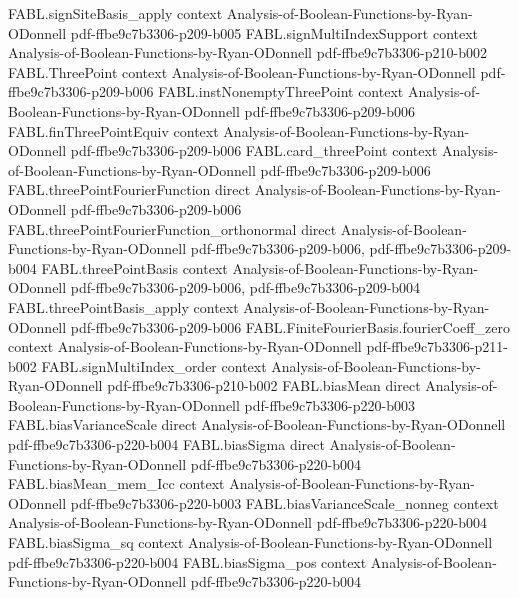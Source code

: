 \begin{theorem}
\proofstep
  {FABL.signSiteBasis_apply}
  {context}
  {Analysis-of-Boolean-Functions-by-Ryan-ODonnell}
  {pdf-ffbe9c7b3306-p209-b005}
\proofstep
  {FABL.signMultiIndexSupport}
  {context}
  {Analysis-of-Boolean-Functions-by-Ryan-ODonnell}
  {pdf-ffbe9c7b3306-p210-b002}
\proofstep
  {FABL.ThreePoint}
  {context}
  {Analysis-of-Boolean-Functions-by-Ryan-ODonnell}
  {pdf-ffbe9c7b3306-p209-b006}
\proofstep
  {FABL.instNonemptyThreePoint}
  {context}
  {Analysis-of-Boolean-Functions-by-Ryan-ODonnell}
  {pdf-ffbe9c7b3306-p209-b006}
\proofstep
  {FABL.finThreePointEquiv}
  {context}
  {Analysis-of-Boolean-Functions-by-Ryan-ODonnell}
  {pdf-ffbe9c7b3306-p209-b006}
\proofstep
  {FABL.card_threePoint}
  {context}
  {Analysis-of-Boolean-Functions-by-Ryan-ODonnell}
  {pdf-ffbe9c7b3306-p209-b006}
\proofstep
  {FABL.threePointFourierFunction}
  {direct}
  {Analysis-of-Boolean-Functions-by-Ryan-ODonnell}
  {pdf-ffbe9c7b3306-p209-b006}
\proofstep
  {FABL.threePointFourierFunction_orthonormal}
  {direct}
  {Analysis-of-Boolean-Functions-by-Ryan-ODonnell}
  {pdf-ffbe9c7b3306-p209-b006,
    pdf-ffbe9c7b3306-p209-b004}
\proofstep
  {FABL.threePointBasis}
  {context}
  {Analysis-of-Boolean-Functions-by-Ryan-ODonnell}
  {pdf-ffbe9c7b3306-p209-b006,
    pdf-ffbe9c7b3306-p209-b004}
\proofstep
  {FABL.threePointBasis_apply}
  {context}
  {Analysis-of-Boolean-Functions-by-Ryan-ODonnell}
  {pdf-ffbe9c7b3306-p209-b006}
\proofstep
  {FABL.FiniteFourierBasis.fourierCoeff_zero}
  {context}
  {Analysis-of-Boolean-Functions-by-Ryan-ODonnell}
  {pdf-ffbe9c7b3306-p211-b002}
\proofstep
  {FABL.signMultiIndex_order}
  {context}
  {Analysis-of-Boolean-Functions-by-Ryan-ODonnell}
  {pdf-ffbe9c7b3306-p210-b002}
\proofstep
  {FABL.biasMean}
  {direct}
  {Analysis-of-Boolean-Functions-by-Ryan-ODonnell}
  {pdf-ffbe9c7b3306-p220-b003}
\proofstep
  {FABL.biasVarianceScale}
  {direct}
  {Analysis-of-Boolean-Functions-by-Ryan-ODonnell}
  {pdf-ffbe9c7b3306-p220-b004}
\proofstep
  {FABL.biasSigma}
  {direct}
  {Analysis-of-Boolean-Functions-by-Ryan-ODonnell}
  {pdf-ffbe9c7b3306-p220-b004}
\proofstep
  {FABL.biasMean_mem_Icc}
  {context}
  {Analysis-of-Boolean-Functions-by-Ryan-ODonnell}
  {pdf-ffbe9c7b3306-p220-b003}
\proofstep
  {FABL.biasVarianceScale_nonneg}
  {context}
  {Analysis-of-Boolean-Functions-by-Ryan-ODonnell}
  {pdf-ffbe9c7b3306-p220-b004}
\proofstep
  {FABL.biasSigma_sq}
  {context}
  {Analysis-of-Boolean-Functions-by-Ryan-ODonnell}
  {pdf-ffbe9c7b3306-p220-b004}
\proofstep
  {FABL.biasSigma_pos}
  {context}
  {Analysis-of-Boolean-Functions-by-Ryan-ODonnell}
  {pdf-ffbe9c7b3306-p220-b004}

\end{theorem}
